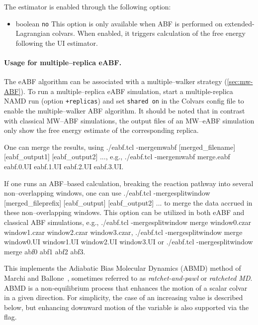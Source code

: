 {The estimator is enabled through the following option:
\begin{itemize}
\item {}
  {boolean}
  {\texttt{no}}
{This option is only available when ABF is performed on extended-Lagrangian colvars.
When enabled, it triggers calculation of the free energy following the UI estimator.}
\end{itemize}

\paragraph*{Usage for multiple--replica eABF.}
The eABF algorithm can be associated with a multiple--walker strategy \cite{Minoukadeh2010,Comer2014c} (\ref{sec:mw-ABF}).
To run a multiple--replica eABF simulation, start a multiple-replica
NAMD run (option \texttt{+replicas}) and set {\tt shared on} in the Colvars config file to enable
the multiple--walker ABF algorithm.
It should be noted that in contrast with classical MW--ABF simulations,
the output files of an MW--eABF simulation only show the free energy estimate of
the corresponding replica.

One can merge the results, using
{\ttfamily ./eabf.tcl -mergemwabf [merged\_filename] [eabf\_output1] [eabf\_output2] ...},
e.g.,
{\ttfamily ./eabf.tcl -mergemwabf merge.eabf eabf.0.UI eabf.1.UI eabf.2.UI eabf.3.UI}.

If one runs an ABF--based calculation, breaking the reaction pathway
into several non--overlapping windows, one can use
{\ttfamily ./eabf.tcl -mergesplitwindow [merged\_fileprefix] [eabf\_output] [eabf\_output2] ...}
to merge the data accrued in these non--overlapping windows.
This option can be utilized in both eABF and classical ABF simulations, e.g.,
{\ttfamily ./eabf.tcl -mergesplitwindow merge window0.czar window1.czar window2.czar window3.czar},
{\ttfamily ./eabf.tcl -mergesplitwindow merge window0.UI window1.UI window2.UI window3.UI} or
{\ttfamily ./eabf.tcl -mergesplitwindow merge abf0 abf1 abf2 abf3}.
}




This implements the Adiabatic Bias Molecular Dynamics (ABMD) method of Marchi and Ballone\ \cite{Marchi1999}, sometimes referred to as \emph{ratchet-and-pawl} or \emph{ratcheted MD}.
ABMD is a non-equilibrium process that enhances the motion of a scalar colvar in a given direction.
For simplicity, the case of an increasing value is described below, but enhancing downward motion of the variable is also supported via the  flag.

